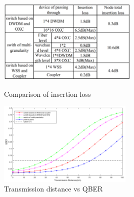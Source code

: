 \documentclass[letterpaper,10pt]{article}
\begin{document}
\begin{figure}[!htb]
   \begin{minipage}{0.48\textwidth}
     \centering
     \includegraphics[height= 4cm,width=.9\linewidth]{comparison_of_three_kind_of_nodes_white}
     \caption{Comparison of insertion loss} \label{Fig:comparison_of_loss}
   \end{minipage}\hfill
   \begin{minipage}{0.48\textwidth}
     \centering
     \includegraphics[height= 4cm,width=.9\linewidth]{transmission_distance_vs_QBER_of_three_nodes_3}
     \caption{Transmission distance vs QBER} \label{Fig:comparison_of_rate}
   \end{minipage}
\end{figure}
\end{document}
